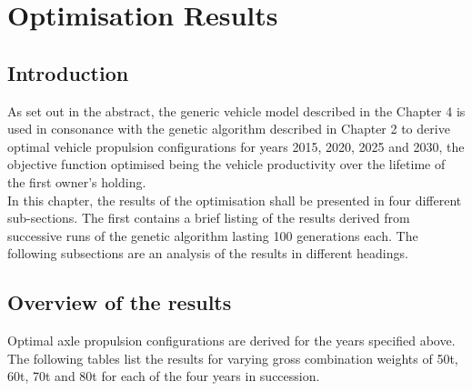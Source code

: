 \documentclass[ExampleMasters.tex]{subfiles}
\begin{document}
\chapter{Optimisation Results}

\section{Introduction}
	As set out in the abstract, the generic vehicle model described in the Chapter 4 is used in consonance with the genetic algorithm described in Chapter 2 to derive optimal vehicle propulsion configurations for years 2015, 2020, 2025 and 2030, the objective function optimised being the vehicle productivity over the lifetime of the first owner's holding.\\

	In this chapter, the results of the optimisation shall be presented in four different sub-sections. The first contains a brief listing of the results derived from successive runs of the genetic algorithm lasting 100 generations each. The following subsections are an analysis of the results in different headings.

\section{Overview of the results}
	Optimal axle propulsion configurations are derived for the years specified above. The following tables list the results for varying gross combination weights of 50t, 60t, 70t and 80t for each of the four years in succession.
\end{document}
